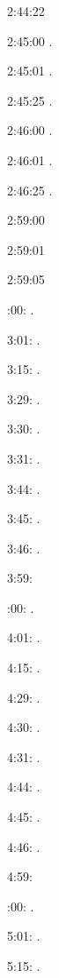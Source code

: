 \documentclass[italian]{article}
\begin{document}
2:44:22   

2:45:00   .

2:45:01   .

2:45:25   .

2:46:00   .

2:46:01   .

2:46:25   .

2:59:00   

2:59:01   

2:59:05   

:00:  .

3:01:   . 

3:15:   . 

3:29:   . 

3:30:   .

3:31:   .

3:44:   .

3:45:   .

3:46:   .

3:59:   

:00:  .

4:01:   . 

4:15:   . 

4:29:   . 

4:30:   .

4:31:   .

4:44:   .

4:45:   .

4:46:   .

4:59:   

:00:  .

5:01:   . 

5:15:   . 
\end{document}
